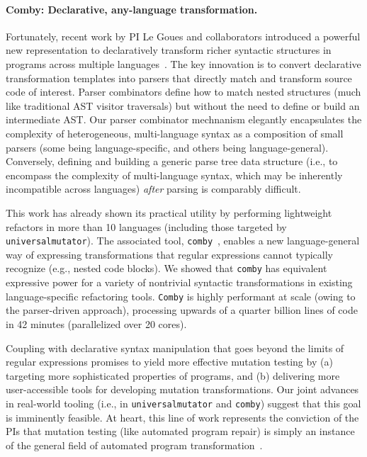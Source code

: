 \paragraph{Comby: Declarative, any-language transformation.} Fortunately, recent work by PI
Le Goues and collaborators introduced a powerful new representation to
declaratively transform richer syntactic structures in programs across multiple
languages~\cite{rvt-ppc}. The key innovation is to convert declarative
transformation templates into parsers that directly match and transform source
code of interest. Parser
combinators define how to match nested structures (much like traditional AST
visitor traversals) but without the need to define or build an intermediate AST.
Our parser combinator mechnanism elegantly encapsulates the complexity of
heterogeneous, multi-language syntax as a composition of small parsers (some
being language-specific, and others being language-general). Conversely, defining and
building a generic parse tree data structure (i.e., to encompass the complexity
of multi-language syntax, which may be inherently incompatible across languages)
\emph{after} parsing is comparably difficult.

This work has already shown its practical utility by performing lightweight
refactors in more than 10 languages (including those targeted by {\tt
  universalmutator}). The associated tool, {\tt comby}~\cite{comby-github},
enables a new language-general way of expressing transformations that regular
expressions cannot typically recognize (e.g., nested code blocks). We showed
that {\tt comby} has equivalent expressive power for a variety of nontrivial syntactic
transformations in existing language-specific refactoring tools. {\tt Comby} is
highly performant at scale (owing to the parser-driven approach), processing
upwards of a quarter billion lines of code in 42 minutes (parallelized over 20 cores).

Coupling with declarative syntax manipulation that goes beyond the limits
of regular expressions  promises to yield more effective mutation testing by (a) targeting more
sophisticated properties of programs, and (b) delivering more user-accessible
tools for developing mutation transformations. Our joint advances in
real-world tooling (i.e., in {\tt universalmutator} and {\tt comby}) suggest that
this goal is imminently feasible.  At heart, this line of work
represents the conviction of the PIs that mutation testing (like
automated program repair) is simply
an instance of the general field of automated program transformation~\cite{Ptransform}.

